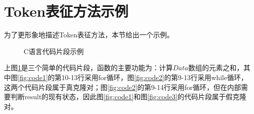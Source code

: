 \section{Token表征方法示例}
\label{sec:Tokenachieve}

为了更形象地描述Token表征方法，本节给出一个示例。

\begin{figure}[htp] 
  \centering  %
  \caption{C语言代码片段示例}    %
  \label{fig:code}    %
\end{figure}

上图\ref{fig:code}是三个简单的代码片段，函数的主要功能为：计算$Data$数组的元素之和，其中图\ref{fig:code1}的第10-13行采用for循环，图\ref{fig:code2}的第9-13行采用while循环，这两个代码片段属于真克隆对；图\ref{fig:code2}的第9-14行采用for循环，但在内部需要判断result的现有状态，因此图\ref{fig:code1}和图\ref{fig:code3}的代码片段属于假克隆对。


